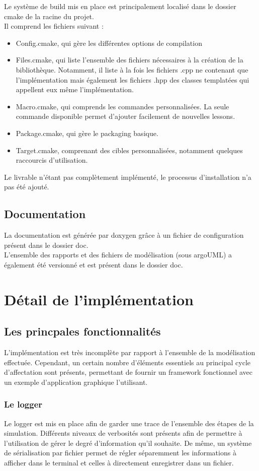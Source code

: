 Le système de build mis en place est principalement localisé dans le dossier cmake de la racine du projet.\\
Il comprend les fichiers suivant :
\begin{itemize}
\item Config.cmake, qui gère les différentes options de compilation
\item Files.cmake, qui liste l'ensemble des fichiers nécessaires à la création de la bibliothèque. Notamment, il liste à la fois les fichiers .cpp ne contenant que l'implémentation mais également les fichiers .hpp des classes templatées qui appellent eux même l'implémentation.
\item Macro.cmake, qui comprends les commandes personnalisées. La seule commande disponible permet d'ajouter facilement de nouvelles lessons.
\item Package.cmake, qui gère le packaging basique.
\item Target.cmake, comprenant des cibles personnalisées, notamment quelques raccourcis d'utilisation.
\end{itemize}

Le livrable n'étant pas complètement implémenté, le processus d'installation n'a pas été ajouté.

\subsection{Documentation}
La documentation est générée par doxygen grâce à un fichier de configuration présent dans le dossier doc.\\
L'ensemble des rapports et des fichiers de modélisation (sous argoUML) a également été versionné et est présent dans le dossier doc.

\section{Détail de l'implémentation}
\subsection{Les princpales fonctionnalités}
L'implémentation est très incomplète par rapport à l'ensemble de la modélisation effectuée. Cependant, un certain nombre d'éléments essentiels au principal cycle d'affectation sont présents, permettant de fournir un framework fonctionnel avec un exemple d'application graphique l'utilisant.

\subsubsection{Le logger}
Le logger est mis en place afin de garder une trace de l'ensemble des étapes de la simulation. Différents niveaux de verbosités sont présents afin de permettre à l'utilisation de gérer le degré d'information qu'il souhaite. De même, un système de sérialisation par fichier permet de régler séparemment les informations à afficher dans le terminal et celles à directement enregistrer dans un fichier.


